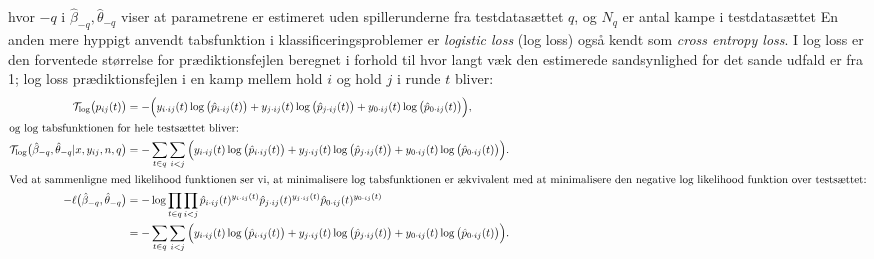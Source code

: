 \documentclass[11pt,a4paper]{article}
\begin{document}
hvor $-q$ i $\hat{\beta}_{-q}, \hat{\theta}_{-q}$ viser at parametrene er estimeret uden spillerunderne fra testdatasættet $q$, og $N_q$ er antal kampe i testdatasættet\newline\newline
En anden mere hyppigt anvendt tabsfunktion i klassificeringsproblemer er \textit{logistic loss} (log loss) også kendt som \textit{cross entropy loss}. I log loss er den forventede størrelse for prædiktionsfejlen beregnet i forhold til hvor langt væk den estimerede sandsynlighed for det sande udfald er fra 1; log loss prædiktionsfejlen i en kamp mellem hold $i$ og hold $j$ i runde $t$ bliver:
\begin{align*}
    \mathcal{T}_{\log} \big{(}p_{ij}(t)\big{)}
    &=-\Big{(}y_{i\cdot ij}(t)\log\big{(}\hat{p}_{i\cdot ij}(t)\big{)}+y_{j\cdot ij}(t)\log\big{(}\hat{p}_{j\cdot ij}(t)\big{)}
    +y_{0\cdot ij}(t)\log\big{(}\hat{p}_{0\cdot ij}(t)\big{)}\Big{)},\\
\intertext{og log tabsfunktionen for hele testsættet bliver:}
\mathcal{T}_{\log}\big{(}\hat{\beta}_{-q},\hat{\theta}_{-q}|x,y_{ij},n,q\big{)}
&=-\sum_{t\in q}\sum_{i<j}\Big{(}y_{i\cdot ij}(t)\log\big{(}\hat{p}_{i\cdot ij}(t)\big{)}
+y_{j\cdot ij}(t)\log\big{(}\hat{p}_{j\cdot ij}(t)\big{)}
+y_{0\cdot ij}(t)\log\big{(}\hat{p}_{0\cdot ij}(t)\big{)}\Big{)}.\\
\intertext{Ved at sammenligne med likelihood funktionen ser vi, at minimalisere log tabsfunktionen er ækvivalent med at minimalisere den negative log likelihood funktion over testsættet:}
-\ell\big{(}\hat{\beta}_{-q},\hat{\theta}_{-q}\big{)}
&=-\log\prod_{t\in q}\prod_{i<j}\hat{p}_{i\cdot ij}(t)^{y_{i\cdot ij}(t)}\hat{p}_{j\cdot ij}(t)^{y_{j\cdot ij}(t)}\hat{p}_{0\cdot ij}(t)^{y_{0\cdot ij}(t)}\\
&=-\sum_{t\in q}\sum_{i<j}\Big{(}y_{i\cdot ij}(t)\log\big{(}\hat{p}_{i\cdot ij}(t)\big{)}+y_{j\cdot ij}(t)\log\big{(}\hat{p}_{j\cdot ij}(t)\big{)}+y_{0\cdot ij}(t)\log\big{(}\hat{p}_{0\cdot ij}(t)\big{)}\Big{)}.
\end{align*}
\end{document}
